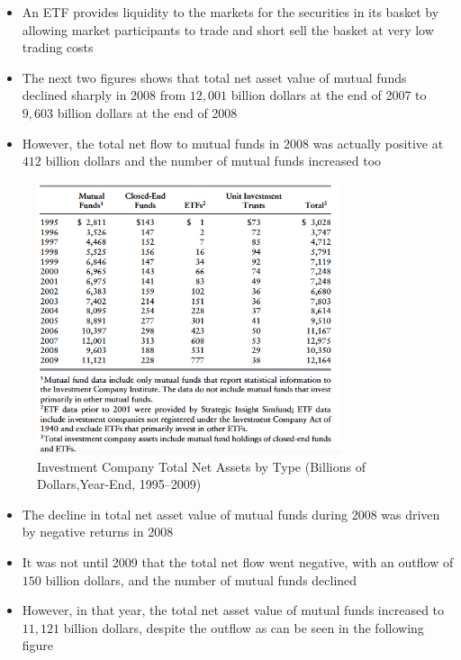 \documentclass[11pt]{beamer}
\begin{document}
\begin{frame}
\begin{itemize}
\item An ETF provides liquidity to the markets for the securities in its basket by allowing market participants to trade and short sell the basket at very low trading costs
\item The next two figures shows that total net asset value of mutual funds declined sharply in 2008 from $12,001$ billion dollars at the end of 2007 to $9,603$ billion dollars at the end of 2008
\item However, the total net flow to mutual funds in 2008 was actually positive at $412$ billion dollars and the number of mutual funds increased too
\end{itemize}
\end{frame}

\begin{frame}
\begin{figure}
\includegraphics[width=0.8\textwidth]{12_1.png}
\caption{Investment Company Total Net Assets by Type (Billions of Dollars,Year-End, 1995–2009)}
\end{figure}
\end{frame}

\begin{frame}
\begin{itemize}
\item The decline in total net asset value of mutual funds during 2008 was driven by negative returns in 2008
\item It was not until 2009 that the total net flow went negative, with an outflow of $150$ billion dollars, and the number of mutual
funds declined
\item However, in that year, the total net asset value of mutual
funds increased to $11,121$ billion dollars, despite the outflow as can be seen in the following figure
\end{itemize}
\end{frame}
\end{document}

